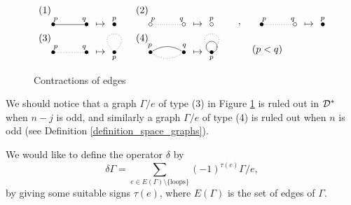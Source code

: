 \begin{figure}[htb]
\[
 \begin{xy}
  (0,20)*{(1)}, (3,15)*{\bullet}="A", (15,15)*{\bullet}="B", {\ar@{-}"A";"B"^<{p}^>{q}},(20,15)*{\mapsto},
  (25,15)*{\bullet},(25,17)*{{\sb p}},
  (35,20)*{(2)}, (38,15)*{\circ}="C", (50,15)*{\circ}="D", {\ar@{.}"C";"D"^<{p}^>{q}},(55,15)*{\mapsto},
  (60,15)*{\circ},(60,17)*{{\sb p}}, (70,15)*{,},
  (78,15)*{\bullet}="E", (90,15)*{\circ}="F", {\ar@{.}"E";"F"^<{p}^>{q}},(95,15)*{\mapsto},
  (100,15)*{\bullet},(100,17)*{{\sb p}},
  (0,10)*{(3)}, (3,5)*{\bullet}="G", (15,5)*{\bullet}="H", {\ar@{.}"G";"H"^<{p}^>{q}},(20,5)*{\mapsto},
  (25,5)*{\bullet},(25,3)*{{\sb p}},{\ar@{.}@(ru,lu)(25,5);(25,5)},
  (35,10)*{(4)}, (38,5)*{\bullet}="I", (50,5)*{\bullet}="J", {\ar@{.}@/_/"I";"J"}, {\ar@{-}@/^/"I";"J"^<{p}^>{q}},
  (55,5)*{\mapsto}, (60,5)*{\bullet},(60,3)*{{\sb p}},{\ar@{.}@(ru,lu)(60,5);(60,5)},
  (60,7)*+[Fo]{\phantom{a}},
  (80,6)*{(p<q)}
  \end{xy}
\]
\caption{Contractions of edges}\label{edge_contraction}
\end{figure}



We should notice that a graph $\Gamma /e$ of type (3) in Figure \ref{edge_contraction} is ruled out in $\mathcal{D}^*$
when $n-j$ is odd, and similarly a graph $\Gamma /e$ of type (4) is ruled out when $n$ is odd (see Definition
\ref{definition_space_graphs}).


We would like to define the operator $\delta$ by
\[
 \delta \Gamma = \sum_{e \in E(\Gamma ) \setminus \{ \text{loops} \}} (-1)^{\tau (e)} \Gamma / e,
\]
by giving some suitable signs $\tau (e)$, where $E(\Gamma )$ is the set of edges of $\Gamma$.


